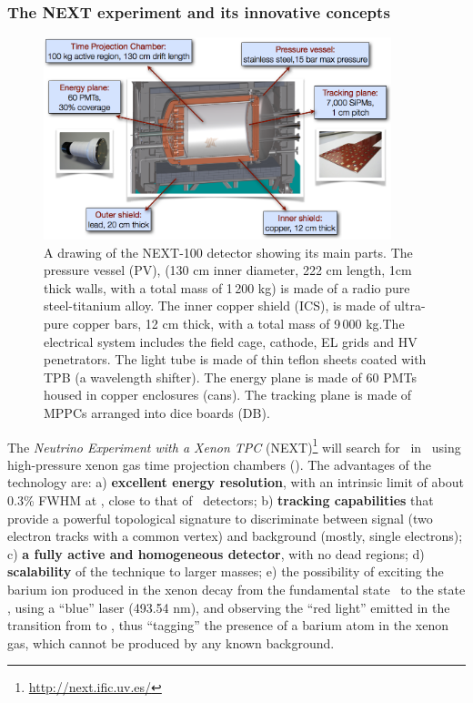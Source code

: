 \subsubsection*{The NEXT experiment and its innovative concepts}
\begin{figure}
\centering
\includegraphics[width=0.9\textwidth]{img/NEXT.png}
\caption{\small A drawing of the NEXT-100 detector showing its main parts.  The pressure vessel (PV),  (130 cm inner diameter, 222 cm length, 1cm thick walls, with a total mass of 1\,200 kg) is made of a radio pure steel-titanium alloy.
The inner copper shield (ICS), is made of ultra-pure copper bars, 12 cm thick, with a total mass of 9\,000 kg.The electrical system includes the field cage, cathode, EL grids and HV penetrators.
The light tube is made of thin teflon sheets coated with TPB (a wavelength shifter). 
The energy plane is made of 60 PMTs housed in copper enclosures (cans).
The tracking plane is made of MPPCs arranged into dice boards (DB). 
}
\end{figure}

The \emph{Neutrino Experiment with a Xenon TPC} (NEXT)\footnote{\href{http://next.ific.uv.es/}{http://next.ific.uv.es/}} will search for \bbonu\ in \XE\ using  high-pressure xenon gas  time projection chambers (\HPXE). The advantages of the technology are: 
a) {\bf excellent energy resolution}, with an intrinsic limit of about 0.3\% FWHM at \Qbb, close to that of \GE\ detectors; b)
{\bf tracking capabilities} that provide a powerful topological signature to discriminate between signal (two electron tracks with a common vertex) and background (mostly, single electrons); c)
{\bf a fully active and homogeneous detector}, with no dead regions; d) {\bf scalability} of the technique to larger masses; e) the possibility of exciting the barium ion produced in the xenon decay from the fundamental state \TwoS\ to the state \TwoP, using a ``blue'' laser (493.54 nm), and observing the ``red light'' emitted in the transition from \TwoP to \TwoD, thus ``tagging'' the presence of a barium atom in the xenon gas, which cannot be produced by any known background. 

